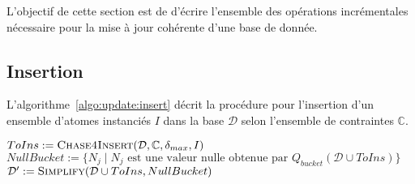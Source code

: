 L'objectif de cette section est de d'écrire l'ensemble des opérations incrémentales nécessaire pour la mise à jour cohérente d'une base de donnée.

\subsection{Insertion}
L'algorithme~\ref{algo:update:insert} décrit la procédure pour l'insertion d'un ensemble d'atomes instanciés $I$ dans la base $\mathcal{D}$ selon l'ensemble de contraintes $\mathbb{C}$.


\begin{algorithm}[ht]
    \caption{$\textsc{Insert}(\mathcal{D}, \mathbb{C}, \delta_{max}, I)$}
    \label{algo:update:insert}
	$ToIns := \textsc{Chase4Insert}(\mathcal{D}, \mathbb{C}, \delta_{max}, I)$ \;
    $NullBucket := \{N_j \mid N_j \text{ est une valeur nulle obtenue par } Q_{bucket}(\mathcal{D} \cup ToIns)\}$ \;
    $\mathcal{D}' := \textsc{Simplify}(\mathcal{D} \cup ToIns, NullBucket)$ \;
\end{algorithm}
